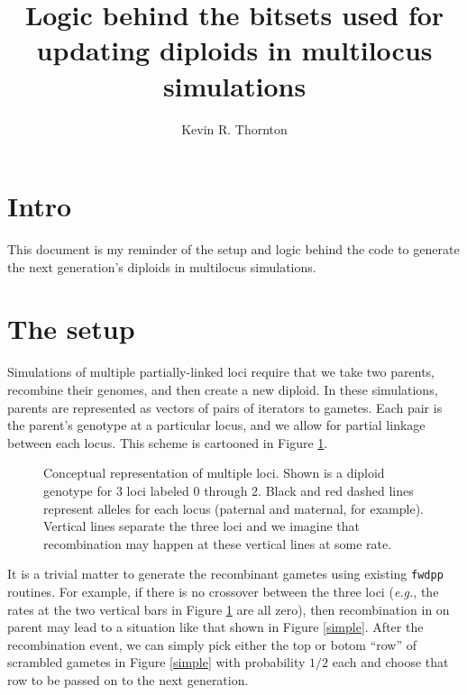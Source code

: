 \documentclass{article}
\title{Logic behind the bitsets used for updating diploids in multilocus simulations}
\author[1]{Kevin R. Thornton}
\affil[1]{Department of Ecology and Evolutionary Biology, UC Irvine}
\date{}
\begin{document}
\maketitle
\section*{Intro}
This document is my reminder of the setup and logic behind the code to generate the next generation's diploids in multilocus simulations.
\section*{The setup}

Simulations of multiple partially-linked loci require that we take two parents, recombine their genomes, and then create a new diploid.  In these simulations, parents are represented as vectors of pairs of iterators to gametes.  Each pair is the parent's genotype at a particular locus, and we allow for partial linkage between each locus.  This scheme is cartooned in Figure \ref{concept}.

\begin{figure}[!h]
  \centering
  \caption{\label{concept}Conceptual representation of multiple loci.  Shown is a diploid genotype for 3 loci labeled 0 through 2.  Black and red dashed lines represent alleles for each locus (paternal and maternal, for example).  Vertical lines separate the three loci and we imagine that recombination may happen at these vertical lines at some rate.}
\end{figure}

It is a trivial matter to generate the recombinant gametes using existing \texttt{fwdpp} routines.  For example, if there is no crossover between the three loci (\textit{e.g.}, the rates at the two vertical bars in Figure \ref{concept} are all zero), then recombination in on parent may lead to a situation like that shown in Figure \ref{simple}.  After the recombination event, we can simply pick either the top or botom ``row'' of scrambled gametes in Figure \ref{simple} with probability $1/2$ each and choose that row to be passed on to the next generation.
  
\end{document}
